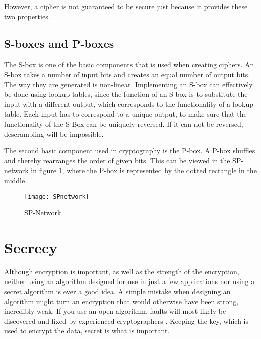 However, a cipher is not guaranteed to be secure just because it 
provides these two properties.

\subsection{S-boxes and P-boxes}
The S-box is one of the basic components that is used when creating 
ciphers. An S-box takes a number of input bits and creates an equal 
number of output bits. The way they are generated is non-linear. 
Implementing an S-box can effectively be done using lookup tables, since
the function of an S-box is to substitute the input with a different 
output, which corresponds to the functionality of a lookup table.
Each input has to correspond to a unique output, to make sure that the 
functionality of the S-Box can be uniquely reversed. If it can not be 
reversed, descrambling will be impossible. 
\citep[pp. 74--75]{Stinson:2006}

The second basic component used in cryptography is the P-box. A P-box 
shuffles and thereby rearranges the order of given bits. This can be 
viewed in the SP-network in figure \ref{img:SPNetwork}, where the P-box 
is represented by the dotted rectangle in the middle.

\begin{figure}[h!]
  \begin{center}
    \texttt{[image: SPnetwork]}
    \caption{SP-Network}
    \label{img:SPNetwork}
  \end{center}
\end{figure}


\section{Secrecy}
Although encryption is important, as well as the strength of the 
encryption, neither using an algorithm designed for use in just a few 
applications nor using a secret algorithm is ever a good idea. A simple 
mistake when designing an algorithm might turn an encryption that would 
otherwise have been strong, incredibly weak. If you use an open 
algorithm, faults will most likely be discovered and fixed by 
experienced cryptographers \citep[pp. 23]{Schneier:2003}. Keeping the 
key, which is used to encrypt the data, secret is what is important.
